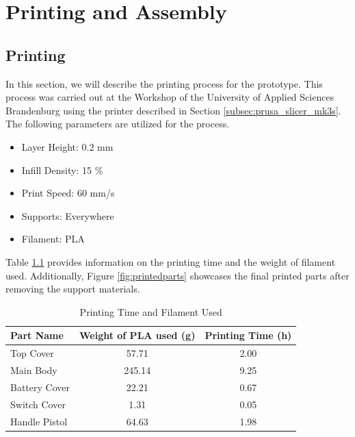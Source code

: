 \chapter{Printing and Assembly}
\label{ch:printingandassembly}

\section{Printing}
\label{sec:printing}

In this section, we will describe the printing process for the prototype. This process was carried out at the Workshop of the University of Applied Sciences Brandenburg using the printer described in Section \ref{subsec:prusa_slicer_mk3s}. The following parameters are utilized for the process.

\begin{itemize}
    \item Layer Height: 0.2 mm
    \item Infill Density: 15 \%
    \item Print Speed: 60 mm/s
    \item Supports: Everywhere
    \item Filament: PLA
\end{itemize}

Table \ref{tab:finalprintingtimeandfilament} provides information on the printing time and the weight of filament used. Additionally, Figure \ref{fig:printedparts} showcases the final printed parts after removing the support materials.


\begin{table}[!ht]
    \centering
    \begin{tabular}{|l|c|c|}
        \hline
        \textbf{Part Name} & \textbf{Weight of PLA used (g)} & \textbf{Printing Time (h)} \\ \hline
        Top Cover          & 57.71                           & 2.00                       \\ \hline
        Main Body          & 245.14                          & 9.25                       \\ \hline
        Battery Cover      & 22.21                           & 0.67                       \\ \hline
        Switch Cover       & 1.31                            & 0.05                       \\ \hline
        Handle Pistol      & 64.63                           & 1.98                       \\ \hline
    \end{tabular}
    \caption{Printing Time and Filament Used}
    \label{tab:finalprintingtimeandfilament}
\end{table}

